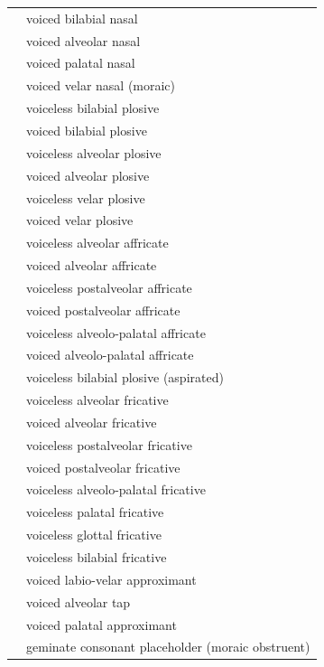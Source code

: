 \documentclass{article}
\begin{document}
\begin{xltabular}{\textwidth}{lL}
   & voiced bilabial nasal \\
   & voiced alveolar nasal \\
   & voiced palatal nasal \\
   & voiced velar nasal (moraic) \\
   & voiceless bilabial plosive \\
   & voiced bilabial plosive \\
   & voiceless alveolar plosive \\
   & voiced alveolar plosive \\
   & voiceless velar plosive \\
   & voiced velar plosive \\
   & voiceless alveolar affricate \\
   & voiced alveolar affricate \\
   & voiceless postalveolar affricate \\
   & voiced postalveolar affricate \\
   & voiceless alveolo-palatal affricate \\
   & voiced alveolo-palatal affricate \\
   & voiceless bilabial plosive (aspirated) \\
   & voiceless alveolar fricative \\
   & voiced alveolar fricative \\
   & voiceless postalveolar fricative \\
   & voiced postalveolar fricative \\
  \ipa{\textctc} & voiceless alveolo-palatal fricative \\
   & voiceless palatal fricative \\
   & voiceless glottal fricative \\
   & voiceless bilabial fricative \\
   & voiced labio-velar approximant \\
  \ipa{\textfishhookr} & voiced alveolar tap \\
   & voiced palatal approximant \\
   & geminate consonant placeholder (moraic obstruent) \\
\end{xltabular}
\end{document}
